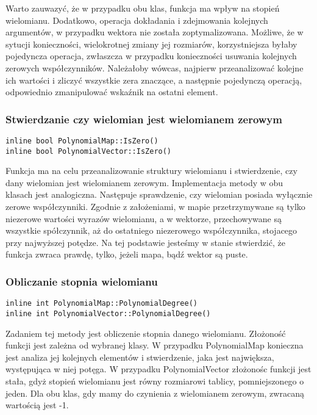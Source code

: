 \documentclass[twoside,a4paper]{book}
\begin{document}
Warto zauwazyć, że w przypadku obu klas, funkcja ma wpływ na stopień wielomianu. Dodatkowo, operacja dokładania i zdejmowania kolejnych argumentów, w przypadku wektora nie została zoptymalizowana. Możliwe, że w sytucji konieczności, wielokrotnej zmiany jej rozmiarów, korzystniejsza byłaby pojedyncza operacja, zwłaszcza w przypadku konieczności usuwania kolejnych zerowych współczynników. Należałoby wówcas, najpierw przeanalizować kolejne ich wartości i zliczyć wszystkie zera znaczące, a następnie pojedynczą operacją, odpowiednio zmanipulować wskaźnik na ostatni element.
\\

\subsubsection{Stwierdzanie czy wielomian jest wielomianem zerowym}
\begin{lstlisting}
inline bool PolynomialMap::IsZero()
inline bool PolynomialVector::IsZero()
\end{lstlisting}

Funkcja ma na celu przeanalizowanie struktury wielomianu i stwierdzenie, czy dany wielomian jest wielomianem zerowym. Implementacja metody w obu klasach jest analogiczna. Następuje sprawdzenie, czy wielomian posiada wyłącznie zerowe współczynniki. Zgodnie z założeniami, w mapie przetrzymywane są tylko niezerowe wartości wyrazów wielomianu, a w wektorze, przechowywane są wszystkie spółczynnik, aż do ostatniego niezerowego współczynnika, stojacego przy najwyższej potędze. Na tej podstawie jesteśmy w stanie stwierdzić, że funkcja zwraca prawdę, tylko, jeżeli mapa, bądź wektor są puste.
\\

\subsubsection{Obliczanie stopnia wielomianu}
\begin{lstlisting}
inline int PolynomialMap::PolynomialDegree()
inline int PolynomialVector::PolynomialDegree()
\end{lstlisting}

Zadaniem tej metody jest obliczenie stopnia danego wielomianu. Złożoność funkcji jest zależna od wybranej klasy. W przypadku PolynomialMap konieczna jest analiza jej kolejnych elementów i stwierdzenie, jaka jest największa, występująca w niej potęga. W przypadku PolynomialVector złożonośc funkcji jest stała, gdyż stopień wielomianu jest równy rozmiarowi tablicy, pomniejszonego o jeden. Dla obu klas, gdy mamy do czynienia z wielomianem zerowym, zwracaną wartością jest -1.
\\
\end{document}
